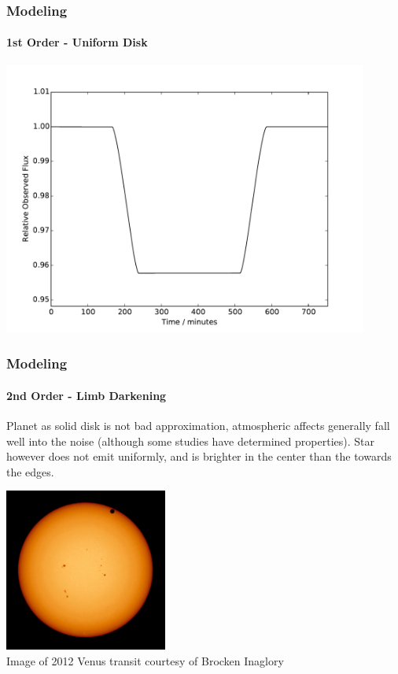 \documentclass{beamer}
\begin{document}
  \begin{frame}
  \frametitle{Modeling}
    \framesubtitle{1st Order - Uniform Disk}
    \begin{center}
    \includegraphics[width=0.9\textwidth]{images/uniform_disk_model.pdf}
    \end{center}
  \end{frame}
  \begin{frame}
  \frametitle{Modeling}
    \framesubtitle{2nd Order - Limb Darkening}
    Planet as solid disk is not bad approximation, atmospheric affects generally fall well into the noise (although some studies have determined properties).
    Star however does not emit uniformly, and is brighter in the center than the towards the edges.
    \begin{center}
    \includegraphics[width=0.4\textwidth]{images/venus_transit.jpg}
    {\tiny\\
    Image of 2012 Venus transit courtesy of Brocken Inaglory}
    \end{center}
  \end{frame}
\end{document}
